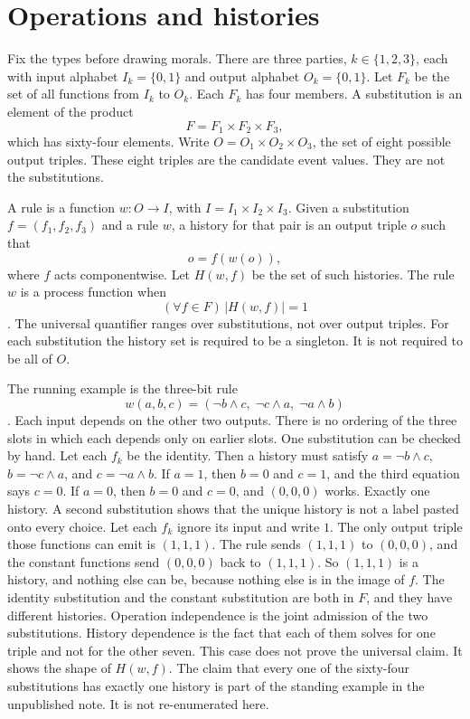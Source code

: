 \documentclass[12pt]{article}
\begin{document}
\section{Operations and histories}
\label{sec:ops}

Fix the types before drawing morals. There are three parties, \(k\in\{1,2,3\}\), each with input alphabet \(I_k=\{0,1\}\) and output alphabet \(O_k=\{0,1\}\). Let \(F_k\) be the set of all functions from \(I_k\) to \(O_k\). Each \(F_k\) has four members. A substitution is an element of the product
\[
F = F_1\times F_2\times F_3,
\]
which has sixty-four elements. Write \(O=O_1\times O_2\times O_3\), the set of eight possible output triples. These eight triples are the candidate event values. They are not the substitutions.

A rule is a function \(w\colon O\to I\), with \(I=I_1\times I_2\times I_3\). Given a substitution \(f=(f_1,f_2,f_3)\) and a rule \(w\), a history for that pair is an output triple \(o\) such that
\[
o = f(w(o)),
\]
where \(f\) acts componentwise. Let \(H(w,f)\) be the set of such histories. The rule \(w\) is a process function when
\[
(\forall f\in F)\,|H(w,f)|=1
\]
\citep{baumeler2016}. The universal quantifier ranges over substitutions, not over output triples. For each substitution the history set is required to be a singleton. It is not required to be all of \(O\).

The running example is the three-bit rule
\[
w(a,b,c)=(\lnot b\land c,\;\lnot c\land a,\;\lnot a\land b)
\]
\citep{baumeler2016,baumeler2019}. Each input depends on the other two outputs. There is no ordering of the three slots in which each depends only on earlier slots. One substitution can be checked by hand. Let each \(f_k\) be the identity. Then a history must satisfy \(a=\lnot b\land c\), \(b=\lnot c\land a\), and \(c=\lnot a\land b\). If \(a=1\), then \(b=0\) and \(c=1\), and the third equation says \(c=0\). If \(a=0\), then \(b=0\) and \(c=0\), and \((0,0,0)\) works. Exactly one history. A second substitution shows that the unique history is not a label pasted onto every choice. Let each \(f_k\) ignore its input and write \(1\). The only output triple those functions can emit is \((1,1,1)\). The rule sends \((1,1,1)\) to \((0,0,0)\), and the constant functions send \((0,0,0)\) back to \((1,1,1)\). So \((1,1,1)\) is a history, and nothing else can be, because nothing else is in the image of \(f\). The identity substitution and the constant substitution are both in \(F\), and they have different histories. Operation independence is the joint admission of the two substitutions. History dependence is the fact that each of them solves for one triple and not for the other seven. This case does not prove the universal claim. It shows the shape of \(H(w,f)\). The claim that every one of the sixty-four substitutions has exactly one history is part of the standing example in the unpublished note. It is not re-enumerated here.
\end{document}
